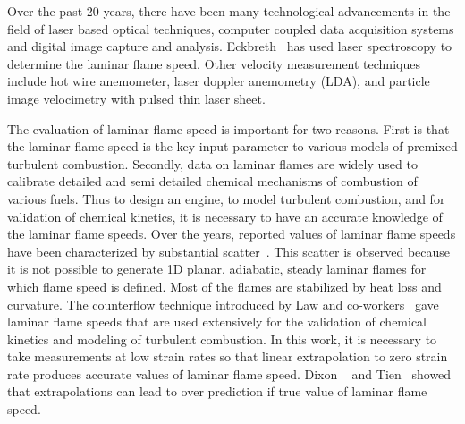  Over the past 20 years, there have been many technological
advancements in the field of laser based optical techniques, computer
coupled data acquisition systems and digital image capture and
analysis. Eckbreth~\cite{eckbreth} has used laser spectroscopy to
determine the laminar flame speed. Other velocity measurement
techniques include hot wire anemometer, laser doppler anemometry (LDA),
and particle image velocimetry with pulsed thin laser sheet.


 The evaluation of laminar flame speed is important for 
two reasons. First is that the laminar flame speed is the key
input parameter to various models of premixed turbulent
combustion. Secondly, data on laminar flames are widely used to calibrate
detailed and semi detailed chemical mechanisms of combustion of
various fuels. Thus to design an engine, to model turbulent combustion,
and for validation of chemical kinetics, it is necessary to have an
accurate knowledge of the laminar flame speeds. Over the years,
reported values of laminar flame speeds have been characterized by
substantial scatter~\cite{Andrew}. This scatter is observed because it
is not possible to generate 1D planar, adiabatic, steady laminar
flames for which flame speed is defined. Most of the flames are
stabilized by heat loss and curvature. The counterflow technique
introduced by Law and co-workers~\cite{law} gave laminar flame speeds
that are used extensively for the validation of chemical kinetics and
modeling of turbulent combustion. In this work, it is necessary to
take measurements at low strain rates so that linear extrapolation to
zero strain rate produces accurate values of laminar flame
speed. Dixon ~\cite{dixon} and Tien~\cite{tien} showed that
extrapolations can lead to over prediction if true value of laminar
flame speed.

